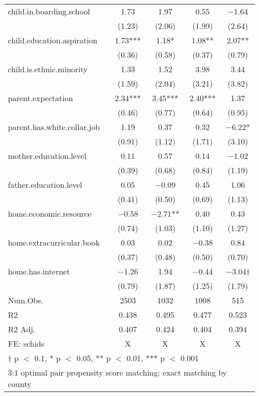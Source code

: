 \documentclass[
  man,floatsintext]{apa7}
\begin{document}
\begin{table}
\begin{tabular}[t]{lcccc}
child.in.boarding.school & \num{1.73} & \num{1.97} & \num{0.55} & \num{-1.64}\\
 & (\num{1.23}) & (\num{2.06}) & (\num{1.99}) & (\num{2.64})\\
child.education.aspiration & \num{1.73}*** & \num{1.18}* & \num{1.08}** & \num{2.07}**\\
 & (\num{0.36}) & (\num{0.58}) & (\num{0.37}) & (\num{0.79})\\
child.is.ethnic.minority & \num{1.33} & \num{1.52} & \num{3.98} & \num{3.44}\\
 & (\num{1.59}) & (\num{2.04}) & (\num{3.21}) & (\num{3.82})\\
parent.expectation & \num{2.34}*** & \num{3.45}*** & \num{2.40}*** & \num{1.37}\\
 & (\num{0.46}) & (\num{0.77}) & (\num{0.64}) & (\num{0.95})\\
parent.has.white.collar.job & \num{1.19} & \num{0.37} & \num{0.32} & \num{-6.22}*\\
 & (\num{0.91}) & (\num{1.12}) & (\num{1.71}) & (\num{3.10})\\
mother.education.level & \num{0.11} & \num{0.57} & \num{0.14} & \num{-1.02}\\
 & (\num{0.39}) & (\num{0.68}) & (\num{0.84}) & (\num{1.19})\\
father.education.level & \num{0.05} & \num{-0.09} & \num{0.45} & \num{1.06}\\
 & (\num{0.41}) & (\num{0.50}) & (\num{0.69}) & (\num{1.13})\\
home.economic.resource & \num{-0.58} & \num{-2.71}** & \num{0.40} & \num{0.43}\\
 & (\num{0.74}) & (\num{1.03}) & (\num{1.10}) & (\num{1.27})\\
home.extracurricular.book & \num{0.03} & \num{0.02} & \num{-0.38} & \num{0.84}\\
 & (\num{0.37}) & (\num{0.48}) & (\num{0.50}) & (\num{0.70})\\
home.has.internet & \num{-1.26} & \num{1.94} & \num{-0.44} & \num{-3.04}†\\
 & (\num{0.79}) & (\num{1.87}) & (\num{1.25}) & (\num{1.79})\\
\midrule
Num.Obs. & \num{2503} & \num{1032} & \num{1008} & \num{515}\\
R2 & \num{0.438} & \num{0.495} & \num{0.477} & \num{0.523}\\
R2 Adj. & \num{0.407} & \num{0.424} & \num{0.404} & \num{0.394}\\
FE: schids & X & X & X & X\\
\bottomrule
\multicolumn{5}{l}{\rule{0pt}{1em}† p $<$ 0.1, * p $<$ 0.05, ** p $<$ 0.01, *** p $<$ 0.001}\\
\multicolumn{5}{l}{\rule{0pt}{1em}3:1 optimal pair propensity score matching; exact matching by county}\\
\end{tabular}
\end{table}
\end{document}

